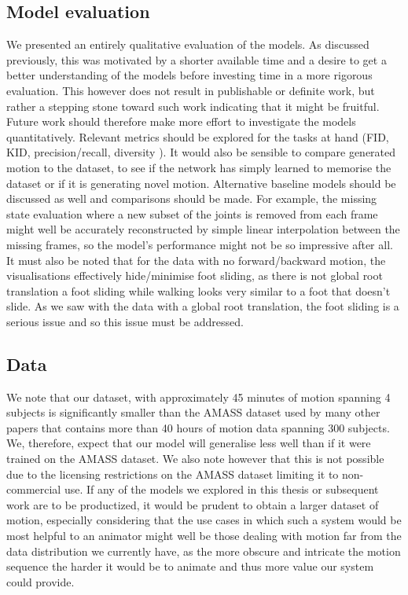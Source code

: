 
\subsection{Model evaluation}
\label{sec:future_work_evaluation}

We presented an entirely qualitative evaluation of the models. As discussed previously, this was motivated by a shorter available time and a desire to get a better understanding of the models before investing time in a more rigorous evaluation. This however does not result in publishable or definite work, but rather a stepping stone toward such work indicating that it might be fruitful. Future work should therefore make more effort to investigate the models quantitatively. Relevant metrics should be explored for the tasks at hand (FID, KID, precision/recall, diversity \cite{Paper_with_useful_metrics_cited_by_MDM}). It would also be sensible to compare generated motion to the dataset, to see if the network has simply learned to memorise the dataset or if it is generating novel motion. Alternative baseline models should be discussed as well and comparisons should be made. For example, the missing state evaluation where a new subset of the joints is removed from each frame might well be accurately reconstructed by simple linear interpolation between the missing frames, so the model's performance might not be so impressive after all. It must also be noted that for the data with no forward/backward motion, the visualisations effectively hide/minimise foot sliding, as there is not global root translation a foot sliding while walking looks very similar to a foot that doesn't slide. As we saw with the data with a global root translation, the foot sliding is a serious issue and so this issue must be addressed.


\subsection{Data}
We note that our dataset, with approximately 45 minutes of motion spanning 4 subjects is significantly smaller than the AMASS \cite{amass} dataset used by many other papers that contains more than 40 hours of motion data spanning 300 subjects. We, therefore, expect that our model will generalise less well than if it were trained on the AMASS dataset. We also note however that this is not possible due to the licensing restrictions on the AMASS dataset limiting it to non-commercial use. If any of the models we explored in this thesis or subsequent work are to be productized, it would be prudent to obtain a larger dataset of motion, especially considering that the use cases in which such a system would be most helpful to an animator might well be those dealing with motion far from the data distribution we currently have, as the more obscure and intricate the motion sequence the harder it would be to animate and thus more value our system could provide.